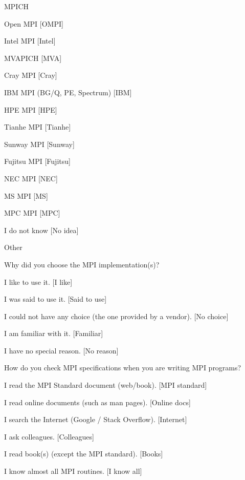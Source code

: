 \documentclass[preprint,5p,times]{elsarticle}
\begin{document}
{\begin{description}
    \begin{inparaenum}[{\bf C}1)]
    \item MPICH
    \item Open MPI [OMPI]
    \item Intel MPI [Intel]
    \item MVAPICH [MVA]
    \item Cray MPI [Cray]
    \item IBM MPI (BG/Q, PE, Spectrum) [IBM]
    \item HPE MPI [HPE]
    \item Tianhe MPI [Tianhe]
    \item Sunway MPI [Sunway]
    \item Fujitsu MPI [Fujitsu]
    \item NEC MPI [NEC]
    \item MS MPI [MS]
    \item MPC MPI [MPC]
    \item I do not know [No idea]
    \item Other
    \end{inparaenum}
  \item[Q13:] Why did you choose the MPI implementation(s)?
    \begin{inparaenum}[{\bf C}1)]
    \item I like to use it. [I like]
    \item I was said to use it. [Said to use]
    \item I could not have any choice (the one provided by a vendor). [No choice]
    \item I am familiar with it. [Familiar]
    \item I have no special reason. [No reason]
    \end{inparaenum}
  \item[Q14*:] How do you check MPI specifications when you are writing MPI programs?
    \begin{inparaenum}[{\bf C}1)]
    \item I read the MPI Standard document (web/book). [MPI standard]
    \item I read online documents (such as man pages). [Online docs]
    \item I search the Internet (Google / Stack Overflow). [Internet]
    \item I ask colleagues. [Colleagues]
    \item I read book(s) (except the MPI standard). [Books]
    \item I know almost all MPI routines. [I know all]

\end{inparaenum}
\end{description}}
\end{document}
